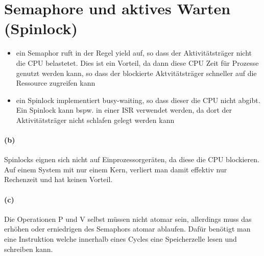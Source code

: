 \documentclass[a4paper]{article}
\begin{document}
\section{Semaphore und aktives Warten (Spinlock)}
\begin{itemize}
    \item ein Semaphor ruft in der Regel yield auf, so dass der Aktivitätsträger nicht die CPU belastetet. Dies ist ein Vorteil, da dann diese CPU Zeit für Prozesse genutzt werden kann, so dass der blockierte Aktvitätsträger schneller auf die Ressource zugreifen kann
    \item ein Spinlock implementiert busy-waiting, so dass dieser die CPU nicht abgibt. Ein Spinlock kann bspw. in einer ISR verwendet werden, da dort der Aktivitätsträger nicht schlafen gelegt werden kann
\end{itemize}

\paragraph{(b)}
Spinlocks eignen sich nicht auf Einprozessorgeräten, da diese die CPU blockieren. Auf einem System mit nur einem Kern, verliert man damit effektiv nur Rechenzeit und hat keinen Vorteil.


\paragraph{(c)}
Die Operationen P und V selbst müssen nicht atomar sein, allerdings muss das erhöhen oder erniedrigen des Semaphors atomar ablaufen. Dafür benötigt man eine Instruktion welche innerhalb eines Cycles eine Speicherzelle lesen und schreiben kann.
\end{document}
